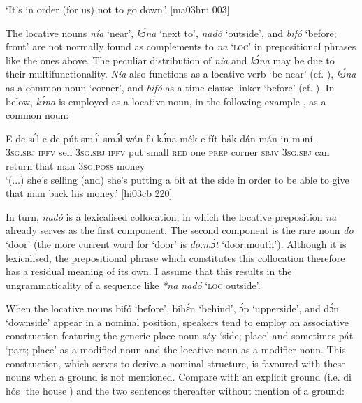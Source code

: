 \glt ‘It’s in order (for us) not to go down.’ [ma03hm 003]
\z

The locative nouns \textit{nía} ‘near’, \textit{kɔ́na} ‘next to’, \textit{nadó} ‘outside’, and \textit{bifó} ‘before; front’ are not normally found as complements to \textit{na} ‘\textsc{loc}’ in prepositional phrases like the ones above. The peculiar distribution of \textit{nía} and \textit{kɔ́na} may be due to their multifunctionality. \textit{Nía} also functions as a locative verb ‘be near’ (cf. ), \textit{kɔ́na} as a common noun ‘corner’, and \textit{bifó} as a time clause linker ‘before’ (cf. ). In  below, \textit{kɔ́na} is employed as a locative noun, in the following example , as a common noun: 


\ea%
    \label{ex:key:916}
    \gll E    de  sɛ́l  e    de  pút  smɔ́l  smɔ́l  wán  fɔ  kɔ́na 
    mék    e    fít  bák    dán  mán    in    mɔní.\\
    \textsc{3sg.sbj}  \textsc{ipfv}  sell  \textsc{3sg.sbj}  \textsc{ipfv}  put  small  \textsc{red}    one  \textsc{prep}  corner
\textsc{sbjv}    \textsc{3sg.sbj}  can  return  that  man    \textsc{3sg.poss}  money\\

\glt ‘(...) she’s selling (and) she’s putting a bit at the side in order to be able to give
that man back his money.’ [hi03cb 220]
\z

In turn, \textit{nadó} is a lexicalised collocation, in which the locative preposition \textit{na} already serves as the first component. The second component is the rare noun \textit{do} ‘door’ (the more current word for ‘door’ is \textit{do.mɔ́t} ‘door.mouth’). Although it is lexicalised, the prepositional phrase which constitutes this collocation therefore has a residual meaning of its own. I assume that this results in the ungrammaticality of a sequence like \textit{*na nadó} ‘\textsc{loc} outside’.


When the locative nouns bifó ‘before’, bihɛ́n ‘behind’, ɔ́p ‘upperside’, and dɔ́n ‘downside’ appear in a nominal position, speakers tend to employ an associative construction featuring the generic place noun sáy ‘side; place’  and sometimes pát ‘part; place’  as a modified noun and the locative noun as a modifier noun. This construction, which serves to derive a nominal structure, is favoured with these nouns when a ground is not mentioned. Compare  with an explicit ground (i.e. di hós ‘the house’) and the two sentences thereafter without mention of a ground:



